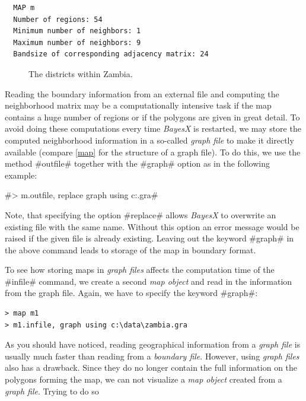 \begin{verbatim}
  MAP m
  Number of regions: 54
  Minimum number of neighbors: 1
  Maximum number of neighbors: 9
  Bandsize of corresponding adjacency matrix: 24
\end{verbatim}

\begin{figure}[ht]
\begin{center}
 {\it\caption{The districts
within Zambia.\label{zambia_reml_zambiamap}}}
\end{center}
\end{figure}

Reading the boundary information from an external file and
computing the neighborhood matrix may be a computationally
intensive task if the map contains a huge number of regions or if
the polygons are given in great detail. To avoid doing these
computations every time {\em BayesX} is restarted, we may store
the computed neighborhood information in a so-called {\it graph
file} to make it directly available (compare \autoref{map} for the
structure of a graph file). To do this, we use the method
#outfile# together with the #graph# option as in the following
example:

#> m.outfile, replace graph using c:\data\zambia.gra#

Note, that specifying the option #replace# allows {\it BayesX} to
overwrite an existing file with the same name. Without this option
an error message would be raised if the given file is already
existing. Leaving out the keyword #graph# in the above command
leads to storage of the map in boundary format.

To see how storing maps in {\it graph files} affects the
computation time of the #infile# command, we create a second {\it
map object} and read in the information from the graph file.
Again, we have to specify the keyword #graph#:

\begin{verbatim}
> map m1
> m1.infile, graph using c:\data\zambia.gra
\end{verbatim}

As you should have noticed, reading geographical information from
a {\it graph file} is usually much faster than reading from a {\it
boundary file}. However, using {\it graph files} also has a
drawback. Since they do no longer contain the full information on
the polygons forming the map, we can not visualize a {\it map
object} created from a {\it graph file}. Trying to do so

